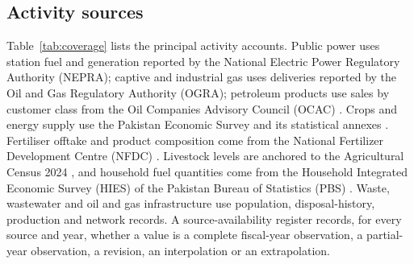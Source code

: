 \documentclass[essd,manuscript]{copernicus}
\begin{document}
\subsection{Activity sources}
Table~\ref{tab:coverage} lists the principal activity accounts. Public power uses station fuel and generation reported by the National Electric Power Regulatory Authority (NEPRA); captive and industrial gas uses deliveries reported by the Oil and Gas Regulatory Authority (OGRA); petroleum products use sales by customer class from the Oil Companies Advisory Council (OCAC) \citep{NEPRA2025,OCAC2026}. Crops and energy supply use the Pakistan Economic Survey and its statistical annexes \citep{MoF2026}. Fertiliser offtake and product composition come from the National Fertilizer Development Centre (NFDC) \citep{NFDC2025}. Livestock levels are anchored to the Agricultural Census 2024 \citep{PBSAgri2026}, and household fuel quantities come from the Household Integrated Economic Survey (HIES) of the Pakistan Bureau of Statistics (PBS) \citep{PBSHIES2026}. Waste, wastewater and oil and gas infrastructure use population, disposal-history, production and network records. A source-availability register records, for every source and year, whether a value is a complete fiscal-year observation, a partial-year observation, a revision, an interpolation or an extrapolation.
\end{document}

